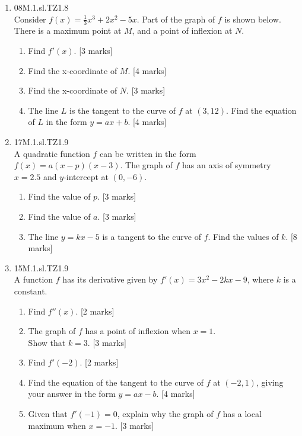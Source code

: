 \documentclass[12pt, twoside]{article}
\begin{document}
\begin{enumerate}
    \item 08M.1.sl.TZ1.8\\
    Consider $f(x)= \frac{1}{3} x^3+2x^2-5x$. Part of the graph of $f$ is shown below. There is a maximum point at $M$, and a point of inflexion at $N$.
      \begin{center}
      \end{center}
      \begin{enumerate}
        \item Find $f'(x)$. [3 marks]
        \item Find the x-coordinate of $M$. [4 marks]
        \item Find the x-coordinate of $N$. [3 marks]
        \item The line $L$ is the tangent to the curve of $f$ at $(3,12)$. Find the equation of $L$ in the form $y=ax+b$. [4 marks]
      \end{enumerate}

    \item 17M.1.sl.TZ1.9\\
    A quadratic function $f$ can be written in the form  $f(x)=a(x-p)(x-3)$. The graph of $f$ has an axis of symmetry $x=2.5$ and $y$-intercept at $(0,-6)$.
    \begin{enumerate}
      \item Find the value of $p$. [3 marks]
      \item Find the value of $a$. [3 marks]
      \item The line $y=kx-5$ is a tangent to the curve of $f$. Find the values of $k$. [8 marks]
    \end{enumerate}

    \item 15M.1.sl.TZ1.9\\
    A function $f$ has its derivative given by $f'(x)=3x^2-2kx-9$, where $k$ is a constant.
    \begin{enumerate}
      \item Find $f''(x)$. [2 marks]
      \item The graph of $f$ has a point of inflexion when $x=1$.\\
      Show that $k=3$. [3 marks]
      \item Find $f'(-2)$. [2 marks]
      \item Find the equation of the tangent to the curve of $f$ at $(-2,1)$, giving your answer in the form  $y=ax-b$. [4 marks]
      \item Given that $f'(-1)=0$, explain why the graph of $f$ has a local maximum when $x=-1$. [3 marks]
    \end{enumerate}


\end{enumerate}
\end{document}
